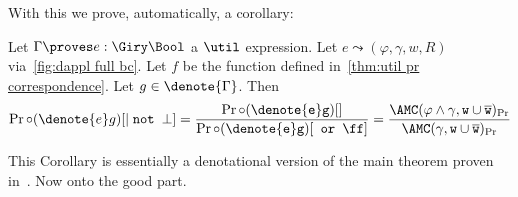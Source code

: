 With this we prove, automatically, a corollary:

\begin{corollary}\label{cor:util pr correspondence}
  Let $\Gamma \proves e : \Giry \Bool$ a $\util$ expression. Let 
  $e \leadsto (\varphi, \gamma, w, R)$ via~\cref{fig:dappl full bc}.
  Let $f$ be the function defined in~\cref{thm:util pr correspondence}. 
  Let $g \in \denote{\Gamma}$.
  Then
  \begin{equation}
    \Pr \circ (\denote{e}g)[\tt \mid \texttt{not }\bot]
    = \frac
      {\Pr \circ (\denote{e}g)[\tt]}
      { \Pr \circ (\denote{e}g)[\tt \texttt{ or } \ff]}
     = \frac{\AMC(\varphi \land \gamma, w \cup \overline w)_{\Pr}}{\AMC(\gamma, w \cup \overline w)_{\Pr}}
  \end{equation}
\end{corollary}

This Corollary is essentially a denotational version of the main theorem proven in~\citet{holtzen2020scaling}.
Now onto the good part.

